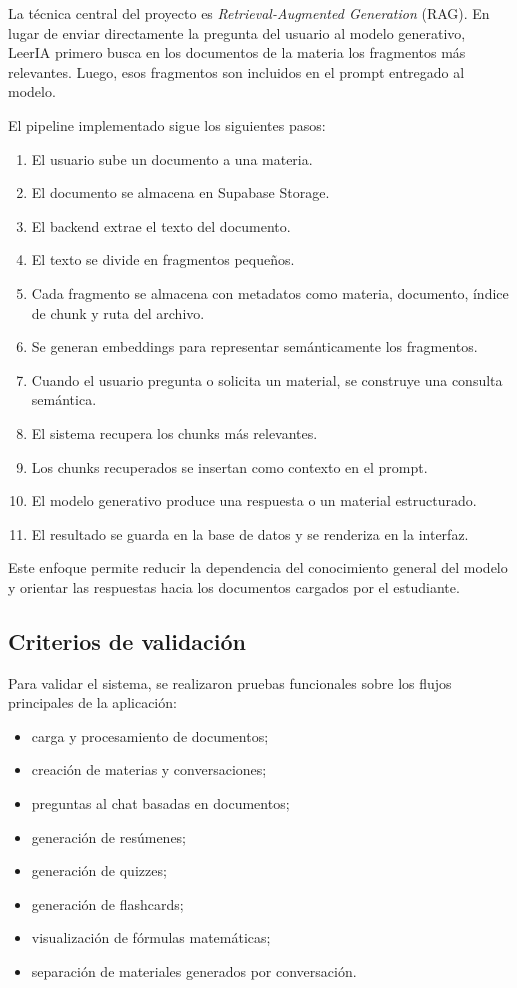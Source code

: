 \documentclass[12pt, letterpaper]{article}
\begin{document}
	La técnica central del proyecto es \textit{Retrieval-Augmented Generation} (RAG). En lugar de enviar directamente la pregunta del usuario al modelo generativo, LeerIA primero busca en los documentos de la materia los fragmentos más relevantes. Luego, esos fragmentos son incluidos en el prompt entregado al modelo.
	
	El pipeline implementado sigue los siguientes pasos:
	
	\begin{enumerate}
		\item El usuario sube un documento a una materia.
		\item El documento se almacena en Supabase Storage.
		\item El backend extrae el texto del documento.
		\item El texto se divide en fragmentos pequeños.
		\item Cada fragmento se almacena con metadatos como materia, documento, índice de chunk y ruta del archivo.
		\item Se generan embeddings para representar semánticamente los fragmentos.
		\item Cuando el usuario pregunta o solicita un material, se construye una consulta semántica.
		\item El sistema recupera los chunks más relevantes.
		\item Los chunks recuperados se insertan como contexto en el prompt.
		\item El modelo generativo produce una respuesta o un material estructurado.
		\item El resultado se guarda en la base de datos y se renderiza en la interfaz.
	\end{enumerate}
	
	Este enfoque permite reducir la dependencia del conocimiento general del modelo y orientar las respuestas hacia los documentos cargados por el estudiante.
	
	\subsection{Criterios de validación}
	
	Para validar el sistema, se realizaron pruebas funcionales sobre los flujos principales de la aplicación:
	
	\begin{itemize}
		\item carga y procesamiento de documentos;
		\item creación de materias y conversaciones;
		\item preguntas al chat basadas en documentos;
		\item generación de resúmenes;
		\item generación de quizzes;
		\item generación de flashcards;
		\item visualización de fórmulas matemáticas;
		\item separación de materiales generados por conversación.
	\end{itemize}
	
\end{document}
